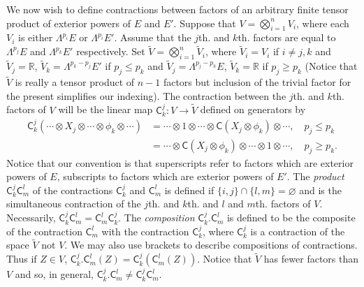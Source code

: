 We now wish to define contractions between factors of an arbitrary finite tensor product of exterior powers of $E$ and $E'$. Suppose that $V=\bigotimes_{i=1}^n V_i$, where each $V_i$ is either $\Lambda^{p_i}E$ or $\Lambda^{p_i}E'$. Assume that the $j$th. and $k$th. factors are equal to $\Lambda^{p_j}E$ and $\Lambda^{p_k}E'$ respectively. Set $\widetilde V=\bigotimes_{i=1}^n\widetilde V_i$, where $\widetilde V_i=V_i$ if $i\neq j,k$ and $\widetilde V_j=\mathbb R$, $\widetilde V_k=\Lambda^{p_k-p_j}E'$ if $p_j\leq p_k$ and $\widetilde V_j=\Lambda^{p_j-p_k}E$, $\widetilde V_k=\mathbb R$ if $p_j\geq p_k$ (Notice that $\widetilde V$ is really
 a tensor product of $n-1$ factors but inclusion of the trivial factor for the present simplifies our indexing). The contraction between the $j$th. and $k$th. factors of $V$ will be the linear map $\mathsf C_k^j:V\to\widetilde V$ defined on generators by
\[
\begin{split}
\mathsf C_k^j(\cdots\otimes X_j\otimes\cdots\otimes\phi_k\otimes\cdots)
&=\cdots\otimes1\otimes\cdots\otimes\mathsf C(X_j\otimes\phi_k)\otimes\cdots,\quad p_j\leq p_k\\
&=\cdots\otimes\mathsf C(X_j\otimes\phi_k)\otimes\cdots\otimes1\otimes\cdots,\quad p_j\geq p_k.
\end{split}
\]
Notice that our convention is that superscripts refer to factors which are exterior powers of $E$, subscripts to factors which are exterior powers of $E'$. The \emph{product} $\mathsf C_k^j\mathsf C_m^l$ of the contractions $\mathsf C_k^j$ and $\mathsf C_m^l$ is defined if $\{i,j\}\cap\{l,m\}=\varnothing$ and is the simultaneous contraction of the $j$th. and $k$th. and $l$ and $m$th. factors of $V$. Necessarily, $\mathsf C_k^j\mathsf C_m^l=\mathsf C_m^l\mathsf C_k^j$. The \emph{composition} $\mathsf C_k^j.\mathsf C_m^l$ is defined to be the composite of the contraction $\mathsf C_m^l$ with the contraction $\mathsf C_k^j$, where $\mathsf C_k^j$ is a contraction of the space $\widetilde V$ not $V$. We may also use brackets to describe compositions of contractions. Thus if $Z\in V$, $\mathsf C_k^j.\mathsf C_m^l(Z)=\mathsf C_k^j(\mathsf C_m^l(Z))$. Notice that $\widetilde V$ has fewer factors than $V$ and so, in general, $\mathsf C_k^j.\mathsf C_m^l\neq\mathsf C_k^j\mathsf C_m^l$.
